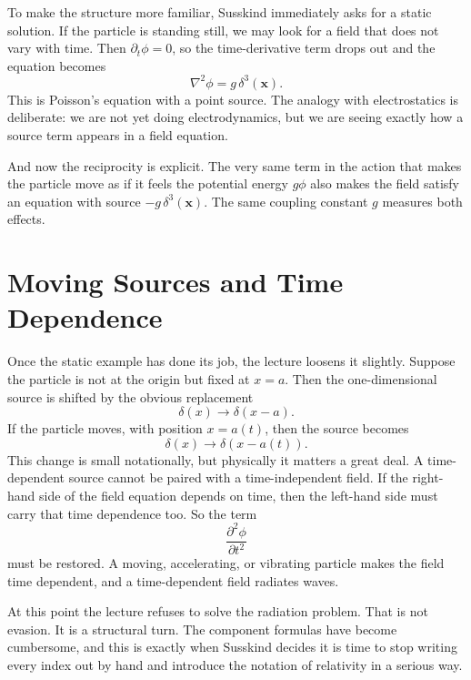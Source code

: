To make the structure more familiar, Susskind immediately asks for a static solution. If the particle is standing still, we may look for a field that does not vary with time. Then \(\partial_t\phi=0\), so the time-derivative term drops out and the equation becomes
\begin{equation}
\nabla^2\phi=g\,\delta^3(\mathbf x).
\end{equation}
This is Poisson's equation with a point source. The analogy with electrostatics is deliberate: we are not yet doing electrodynamics, but we are seeing exactly how a source term appears in a field equation.

And now the reciprocity is explicit. The very same term in the action that makes the particle move as if it feels the potential energy \(g\phi\) also makes the field satisfy an equation with source \(-g\,\delta^3(\mathbf x)\). The same coupling constant \(g\) measures both effects.

\section{Moving Sources and Time Dependence}

Once the static example has done its job, the lecture loosens it slightly. Suppose the particle is not at the origin but fixed at \(x=a\). Then the one-dimensional source is shifted by the obvious replacement
\begin{equation}
\delta(x)\longrightarrow \delta(x-a).
\end{equation}
If the particle moves, with position \(x=a(t)\), then the source becomes
\begin{equation}
\delta(x)\longrightarrow \delta(x-a(t)).
\end{equation}
This change is small notationally, but physically it matters a great deal. A time-dependent source cannot be paired with a time-independent field. If the right-hand side of the field equation depends on time, then the left-hand side must carry that time dependence too. So the term
\begin{equation}
\frac{\partial^2\phi}{\partial t^2}
\end{equation}
must be restored. A moving, accelerating, or vibrating particle makes the field time dependent, and a time-dependent field radiates waves.

At this point the lecture refuses to solve the radiation problem. That is not evasion. It is a structural turn. The component formulas have become cumbersome, and this is exactly when Susskind decides it is time to stop writing every index out by hand and introduce the notation of relativity in a serious way.

